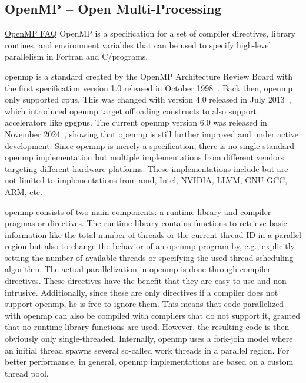 \subsection{OpenMP -- Open Multi-Processing}
\label{sec:frameworks:openmp}

\begin{quotebox}{\href{https://www.openmp.org/about/openmp-faq/\#WhatIs}{OpenMP FAQ}}
OpenMP is a specification for a set of compiler directives, library routines, and environment variables that can be used to specify high-level parallelism in Fortran and C/\cpp programs.
\end{quotebox}

\acrfull{openmp} is a standard created by the OpenMP Architecture Review Board with the first specification version 1.0 released in October 1998~\cite{openmp_architecture_review_board_openmp_1998}. 
Back then, \gls{openmp} only supported \glspl{cpu}. 
This was changed with version 4.0 released in July 2013~\cite{openmp_architecture_review_board_openmp_2013}, which introduced \gls{openmp} target offloading constructs to also support accelerators like \glspl{gpgpu}. 
The current \gls{openmp} version 6.0 was released in November 2024~\cite{openmp_architecture_review_board_openmp_2024}, showing that \gls{openmp} is still further improved and under active development. 
Since \gls{openmp} is merely a specification, there is no single standard \gls{openmp} implementation but multiple implementations from different vendors targeting different hardware platforms. 
These implementations include but are not limited to implementations from \gls{amd}, Intel, NVIDIA, LLVM, GNU GCC, ARM, etc. 

\gls{openmp} consists of two main components: a runtime library and compiler pragmas or directives. 
The runtime library contains functions to retrieve basic information like the total number of threads or the current thread ID in a parallel region but also to change the behavior of an \gls{openmp} program by, e.g., explicitly setting the number of available threads or specifying the used thread scheduling algorithm. 
The actual parallelization in \gls{openmp} is done through compiler directives. 
These directives have the benefit that they are easy to use and non-intrusive. 
Additionally, since these are only directives if a compiler does not support \gls{openmp}, he is free to ignore them. 
This means that code parallelized with \gls{openmp} can also be compiled with compilers that do not support it, granted that no runtime library functions are used. 
However, the resulting code is then obviously only single-threaded.  
Internally, \gls{openmp} uses a fork-join model where an initial thread spawns several so-called work threads in a parallel region. 
For better performance, in general, \gls{openmp} implementations are based on a custom thread pool. 

